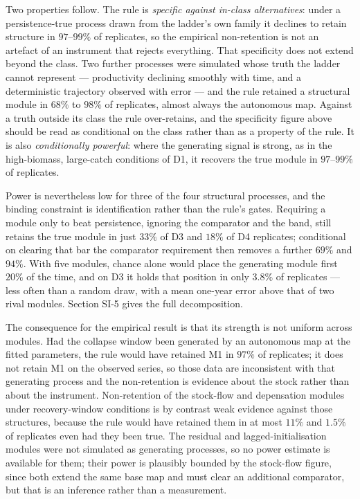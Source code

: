 \documentclass[11pt]{article}
\begin{document}
Two properties follow. The rule is \emph{specific against in-class
alternatives}: under a persistence-true process drawn from the ladder's
own family it declines to retain structure in \(97\)--\(99\%\) of
replicates, so the empirical non-retention is not an artefact of an
instrument that rejects everything. That specificity does not extend
beyond the class. Two further processes were simulated whose truth the
ladder cannot represent --- productivity declining smoothly with time,
and a deterministic trajectory observed with error --- and the rule
retained a structural module in \(68\%\) to \(98\%\) of replicates,
almost always the autonomous map. Against a truth outside its class the
rule over-retains, and the specificity figure above should be read as
conditional on the class rather than as a property of the rule. It is also \emph{conditionally
powerful}: where the generating signal is strong, as in the
high-biomass, large-catch conditions of D1, it recovers the true module
in \(97\)--\(99\%\) of replicates.

Power is nevertheless low for three of the four structural processes,
and the binding constraint is identification rather than the rule's
gates. Requiring a module only to beat persistence, ignoring the
comparator and the band, still retains the true module in just
\(33\%\) of D3 and \(18\%\) of D4 replicates; conditional on clearing
that bar the comparator requirement then removes a further \(69\%\) and
\(94\%\). With five modules, chance alone would place the generating
module first \(20\%\) of the time, and on D3 it holds that position in
only \(3.8\%\) of replicates --- less often than a random draw, with a
mean one-year error above that of two rival modules. Section SI-5 gives
the full decomposition.

The consequence for the empirical result is that its strength is not
uniform across modules. Had the collapse window been generated by an
autonomous map at the fitted parameters, the rule would have retained
M1 in \(97\%\) of replicates; it does not retain M1 on the observed
series, so those data are inconsistent with that generating process and
the non-retention is evidence about the stock rather than about the
instrument. Non-retention of the stock-flow and depensation modules
under recovery-window conditions is by contrast weak evidence against
those structures, because the rule would have retained them in at most
\(11\%\) and \(1.5\%\) of replicates even had they been true. The
residual and lagged-initialisation modules were not simulated as
generating processes, so no power estimate is available for them; their
power is plausibly bounded by the stock-flow figure, since both extend
the same base map and must clear an additional comparator, but that is
an inference rather than a measurement.
\end{document}

